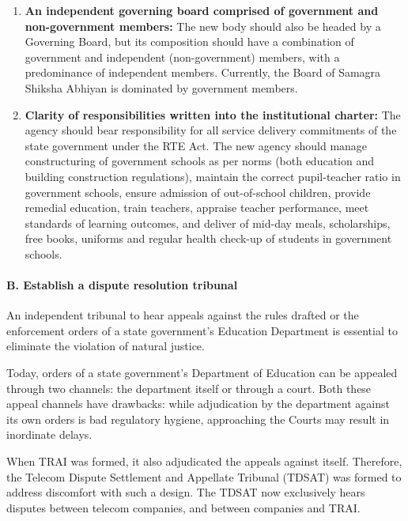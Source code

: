 \documentclass[a4paper, 12pt, twoside]{article}
\begin{document}
\begin{enumerate}

\item \textbf{An independent governing board comprised of government and non-government members:} The new body should also be headed by a Governing Board, but its composition should have a combination of government and independent (non-government) members, with a predominance of independent members. Currently, the Board of Samagra Shiksha Abhiyan is dominated by government members.

\item \textbf{Clarity of responsibilities written into the institutional charter:} The agency should bear responsibility for all service delivery commitments of the state government under the RTE Act. The new agency should manage constructuring of government schools as per norms (both education and building construction regulations), maintain the correct pupil-teacher ratio in government schools, ensure admission of out-of-school children, provide remedial education, train teachers, appraise teacher performance, meet standards of learning outcomes, and deliver of mid-day meals, scholarships, free books, uniforms and regular health check-up of students in government schools.  
\end{enumerate}

\paragraph*{B. Establish a dispute resolution tribunal}

An independent tribunal to hear appeals against the rules drafted or the enforcement orders of a state government’s Education Department is essential to eliminate the violation of natural justice.

Today, orders of a state government’s Department of Education can be appealed through two channels: the department itself or through a court. Both these appeal channels have drawbacks: while adjudication by the department against its own orders is bad regulatory hygiene, approaching the Courts may result in inordinate delays. 

When TRAI was formed, it also adjudicated the appeals against itself. Therefore, the Telecom Dispute Settlement and Appellate Tribunal (TDSAT) was formed to address discomfort with such a design. The TDSAT now exclusively hears disputes between telecom companies, and between companies and TRAI.
\end{document}
